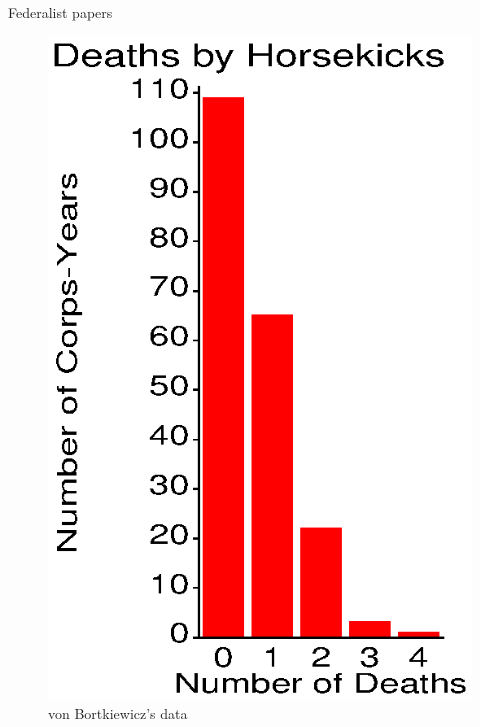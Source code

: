 \begin{Example}[madison1]{Federalist papers}
\begin{figure}[htb]
 \begin{minipage}[b]{.5\linewidth}
  \centering
  \includegraphics[width=.9\linewidth,clip]{ch2/fig/poischart1.eps}
  \caption{von Bortkiewicz's data}\label{fig:poischart1}
 \end{minipage}%
 \begin{minipage}[b]{.5\linewidth}
  \centering

\end{minipage}
\end{figure}
\end{Example}
